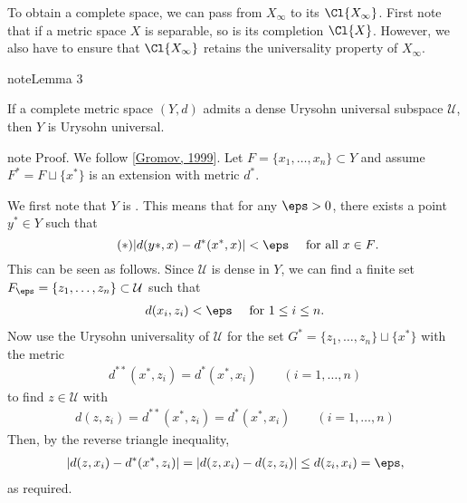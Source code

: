 \documentclass[letterpaper,10pt,english]{jupyterBook}
\begin{document}
\sphinxAtStartPar
To obtain a complete space, we can pass from \(X_\infty\) to its  \(\Cl{X_\infty}\). First note that if a metric space \(X\) is separable, so is its completion \(\Cl{X}\). However, we also have to ensure that \(\Cl{X_\infty}\) retains the universality property of \(X_\infty\).
\label{Urysohn:lemma-6}
\begin{sphinxadmonition}{note}{Lemma 3}



\sphinxAtStartPar
If a complete metric space \((Y,d)\) admits a dense Urysohn universal subspace \(\mathcal{U}\), then \(Y\) is Urysohn universal.
\end{sphinxadmonition}

\begin{sphinxadmonition}{note}
\sphinxAtStartPar
Proof. We follow {[}\hyperlink{cite.bibliography:id6}{Gromov, 1999}{]}. Let \(F = \{x_1, \dots, x_n\} \subset Y\) and assume \(F^* = F \sqcup \{x^*\}\) is an extension with metric \(d^*\).

\sphinxAtStartPar
We first note that \(Y\) is . This means that for any \(\eps > 0\), there exists a point \(y^* \in Y\) such that
\begin{equation*} \tag{$*$}
	|d(y*,x) - d^*(x^*,x)| < \eps \quad \text{ for all $x \in F$}.
\end{equation*}
\sphinxAtStartPar
This can be seen as follows. Since \(\mathcal{U}\) is dense in \(Y\), we can find a finite set \(F_\eps = \{z_1, \dots, z_n\} \subset \mathcal{U}\) such that
\begin{equation*}
\begin{split}
	d(x_i, z_i) < \eps \quad \text{ for $1 \leq i \leq n$}.
\end{split}
\end{equation*}
\sphinxAtStartPar
Now use the Urysohn universality of \(\mathcal{U}\) for the set \(G^* = \{z_1, \dots , z_n\} \sqcup \{x^*\}\) with the metric
\begin{equation*}
\begin{split}
	d^{**}(x^*, z_i) = d^*(x^*, x_i) \qquad (i = 1, \dots, n)
\end{split}
\end{equation*}
\sphinxAtStartPar
to find \(z \in \mathcal{U}\) with
\begin{equation*}
\begin{split}
	d(z,z_i) = d^{**}(x^*,z_i) = d^*(x^*,x_i) \qquad (i = 1, \dots, n)
\end{split}
\end{equation*}
\sphinxAtStartPar
Then, by the reverse triangle inequality,
\begin{equation*}
\begin{split}
	\left | d(z,x_i) - d^*(x^*,z_i) \right | = \left | d(z,x_i) - d(z,z_i) \right | \leq d(z_i, x_i) = \eps,
\end{split}
\end{equation*}
\sphinxAtStartPar
as required.




\end{sphinxadmonition}
\end{document}
